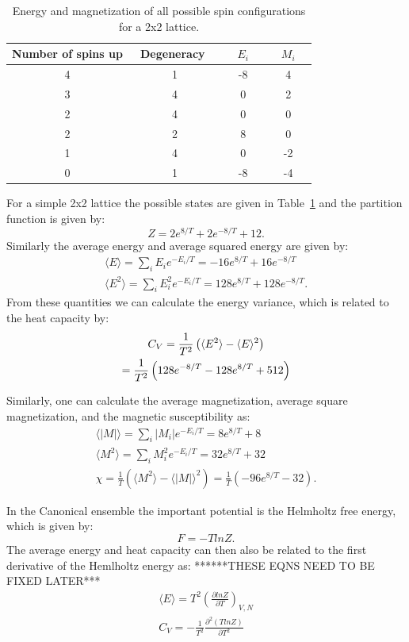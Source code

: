 \documentclass[prc,amsmath,twocolumn,superscriptaddress]{revtex4}
\begin{document}
\begin{table}[b]
\centering
\begin{tabular}{|c|c|c|c|}
\hline
Number of spins up & ~Degeneracy ~& ~ $E_i$ ~& ~ $M_i$ ~\\
\hline
4&1&-8&4\\
3&4&0&2\\
2&4&0&0\\
2&2&8&0\\
1&4&0&-2\\
0&1&-8&-4\\
\hline
\end{tabular}
\caption{Energy and magnetization of all possible spin configurations for a 2x2 lattice.}
\label{states}
\end{table}

For a simple 2x2 lattice the possible states are given in Table~\ref{states} and the partition function is given by:
\begin{equation}
Z = 2e^{8/T}+2e^{-8/T}+12.
\end{equation}
Similarly the average energy and average squared energy are given by:
\begin{gather}
\langle E\rangle= \sum_i E_i e^{-E_i/T} = -16e^{8/T}+16e^{-8/T}\\
\langle E^2\rangle= \sum_i E^2_i e^{-E_i/T} = 128e^{8/T}+128e^{-8/T}.
\end{gather}
From these quantities we can calculate the energy variance, which is related to the heat capacity by:
\begin{gather}
C_V = \frac{1}{T^2} \left(\langle E^2\rangle-\langle E\rangle^2\right) \notag \\
= \frac{1}{T^2} \left(128e^{-8/T}-128e^{8/T}+512\right)
\end{gather}

Similarly, one can calculate the average magnetization, average square magnetization, and the magnetic susceptibility as:
\begin{gather}
\langle |M|\rangle= \sum_i |M_i| e^{-E_i/T} = 8e^{8/T}+8\\
\langle M^2\rangle= \sum_i M^2_i e^{-E_i/T} = 32e^{8/T}+32 \\
\chi = \frac{1}{T} \left(\langle M^2\rangle-\langle |M|\rangle^2\right)= \frac{1}{T} \left(-96e^{8/T}-32\right).
\end{gather}

In the Canonical ensemble the important potential is the Helmholtz free energy, which is given by:
\begin{equation}
F = -TlnZ.
\end{equation}
The average energy and heat capacity can then also be related to the first derivative of the Hemlholtz energy as:
******THESE EQNS NEED TO BE FIXED LATER***
\begin{gather}
\langle E \rangle = T^2\left( \frac{\partial lnZ}{\partial T}\right)_{V,N} \\
C_{V}=-\frac{1}{T^2}\frac{\partial^2 (TlnZ)}{\partial T^2}
\end{gather}
\end{document}
